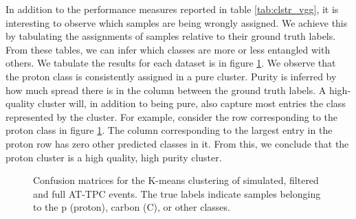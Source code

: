 In addition to the performance measures reported in table \ref{tab:clstr_vgg}, it is interesting to observe which samples are being wrongly assigned. We achieve this by tabulating the assignments of samples relative to their ground truth labels. From these tables, we can infer which classes are more or less entangled with others. We tabulate the results for each dataset is in figure \ref{fig:clster_confmat}. We observe that the proton class is consistently assigned in a pure cluster. Purity is inferred by how much spread there is in the column between the ground truth labels. A high-quality cluster will, in addition to being pure, also capture most entries the class represented by the cluster. For example, consider the row corresponding to the proton class in figure \ref{fig:clster_confmat}. The column corresponding to the largest entry in the proton row has zero other predicted classes in it. From this, we conclude that the proton cluster is a high quality, high purity cluster. 

\begin{figure}
\centering

	\hspace{-1cm}
	\hspace{-1cm}
\caption[Pre-trained network - confusion matrices]{Confusion matrices for the K-means clustering of simulated, filtered and full AT-TPC events. The true labels indicate samples belonging to the p (proton), carbon (C), or other classes. }\label{fig:clster_confmat}
\end{figure}

